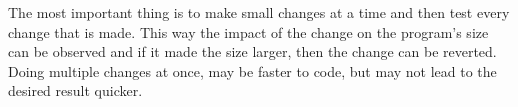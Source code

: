 The most important thing is to make small changes at a time and then test every change that is made. This way the impact of the change on the program's size can be observed and if it made the size larger, then the change can be reverted. Doing multiple changes at once, may be faster to code, but may not lead to the desired result quicker.




